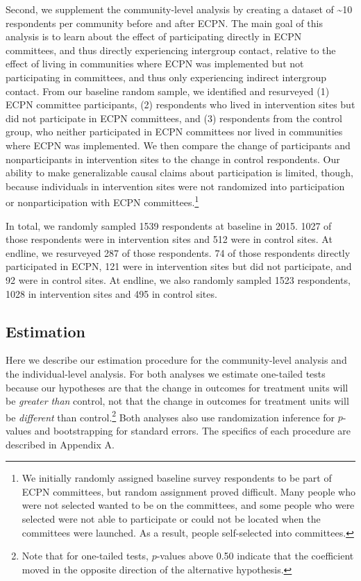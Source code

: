 \documentclass[11pt]{article}
\begin{document}
Second, we supplement the community-level analysis by creating a dataset
of \textasciitilde10 respondents per community before and after ECPN.
The main goal of this analysis is to learn about the effect of
participating directly in ECPN committees, and thus directly
experiencing intergroup contact, relative to the effect of living in
communities where ECPN was implemented but not participating in
committees, and thus only experiencing indirect intergroup contact. From
our baseline random sample, we identified and resurveyed (1) ECPN
committee participants, (2) respondents who lived in intervention sites
but did not participate in ECPN committees, and (3) respondents from the
control group, who neither participated in ECPN committees nor lived in
communities where ECPN was implemented. We then compare the change of
participants and nonparticipants in intervention sites to the change in
control respondents. Our ability to make generalizable causal claims
about participation is limited, though, because individuals in
intervention sites were not randomized into participation or
nonparticipation with ECPN committees.\footnote{We initially randomly
  assigned baseline survey respondents to be part of ECPN committees,
  but random assignment proved difficult. Many people who were not
  selected wanted to be on the committees, and some people who were
  selected were not able to participate or could not be located when the
  committees were launched. As a result, people self-selected into
  committees.}

In total, we randomly sampled 1539 respondents at baseline in 2015. 1027
of those respondents were in intervention sites and 512 were in control
sites. At endline, we resurveyed 287 of those respondents. 74 of those
respondents directly participated in ECPN, 121 were in intervention
sites but did not participate, and 92 were in control sites. At endline,
we also randomly sampled 1523 respondents, 1028 in intervention sites
and 495 in control sites.

\hypertarget{estimation}{%
\subsection{Estimation}\label{estimation}}

Here we describe our estimation procedure for the community-level
analysis and the individual-level analysis. For both analyses we
estimate one-tailed tests because our hypotheses are that the change in
outcomes for treatment units will be \emph{greater than} control, not
that the change in outcomes for treatment units will be \emph{different}
than control.\footnote{Note that for one-tailed tests, \(p\)-values
  above 0.50 indicate that the coefficient moved in the opposite
  direction of the alternative hypothesis.} Both analyses also use
randomization inference for \(p\)-values and bootstrapping for standard
errors. The specifics of each procedure are described in Appendix A.
\end{document}
